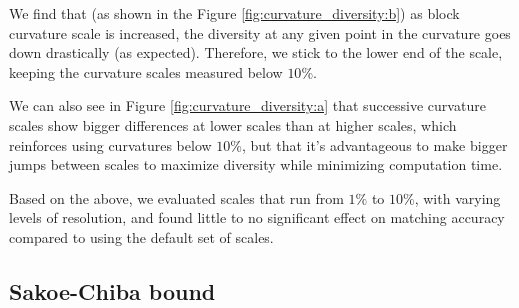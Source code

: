 We find that (as shown in the Figure \ref{fig:curvature_diversity:b}) as block curvature scale is increased, the diversity at any given point in the curvature goes down drastically (as expected). 
Therefore, we stick to the lower end of the scale, keeping the curvature scales measured below $10\%$.

We can also see in Figure \ref{fig:curvature_diversity:a} that successive curvature scales show bigger differences at lower scales than at higher scales, which reinforces using curvatures below $10\%$, but that it's advantageous to make bigger jumps between scales to maximize diversity while minimizing computation time.

Based on the above, we evaluated scales that run from $1\%$ to $10\%$, with varying levels of resolution, and found little to no significant effect on matching accuracy compared to using the default set of scales.


\subsection{Sakoe-Chiba bound}





